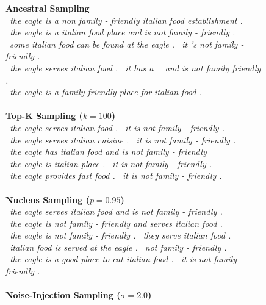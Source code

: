 \begin{figure}[t]
\small
\textbf{Ancestral Sampling}\\
\textit{\starttok~the eagle is a non family - friendly italian food establishment . \stoptok}\\
\textit{\starttok~the eagle is a italian food place and is not family - friendly . \stoptok}\\
\textit{\starttok~some italian food can be found at the eagle . \senttok~it 's not family - friendly . \stoptok}\\
\textit{\starttok~the eagle serves italian food . \senttok~it has a \unktok~\unktok~and is not family friendly . \stoptok}\\
\textit{\starttok~the eagle is a family friendly place for italian food . \stoptok}\\
~\\
\textbf{Top-K Sampling ($k=100$)}\\
\textit{\starttok~the eagle serves italian food . \senttok~it is not family - friendly . \stoptok}\\
\textit{\starttok~the eagle serves italian cuisine . \senttok~it is not family - friendly . \stoptok}\\
\textit{\starttok~the eagle has italian food and is not family - friendly \stoptok}\\
\textit{\starttok~the eagle is italian place . \senttok~it is not family - friendly . \stoptok}\\
\textit{\starttok~the eagle provides fast food . \senttok~it is not family - friendly . \stoptok}\\
~\\
\textbf{Nucleus Sampling ($p=0.95$)}\\
\textit{\starttok~the eagle serves italian food and is not family - friendly . \stoptok}\\
\textit{\starttok~the eagle is not family - friendly and serves italian food . \stoptok}\\
\textit{\starttok~the eagle is not family - friendly . \senttok~they serve italian food . \stoptok}\\
\textit{\starttok~italian food is served at the eagle . \senttok~not family - friendly . \stoptok}\\
\textit{\starttok~the eagle is a good place to eat italian food . \senttok~it is not family - friendly . \stoptok}\\
~\\
\textbf{Noise-Injection Sampling ($\sigma=2.0$)}\\

\end{figure}
